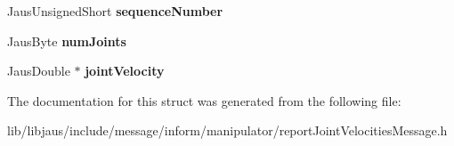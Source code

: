 \begin{DoxyCompactItemize}
\item 
\hypertarget{struct_report_joint_velocities_message_struct_a3d0eedb7246ea7f95f4e610151d31f1f}{\-Jaus\-Unsigned\-Short {\bfseries sequence\-Number}}\label{struct_report_joint_velocities_message_struct_a3d0eedb7246ea7f95f4e610151d31f1f}

\item 
\hypertarget{struct_report_joint_velocities_message_struct_a3cfe7d8bde53bf279ff0e1713fd44b6c}{\-Jaus\-Byte {\bfseries num\-Joints}}\label{struct_report_joint_velocities_message_struct_a3cfe7d8bde53bf279ff0e1713fd44b6c}

\item 
\hypertarget{struct_report_joint_velocities_message_struct_aaf1b5152424b3468eb76343627cd4510}{\-Jaus\-Double $\ast$ {\bfseries joint\-Velocity}}\label{struct_report_joint_velocities_message_struct_aaf1b5152424b3468eb76343627cd4510}

\end{DoxyCompactItemize}


\-The documentation for this struct was generated from the following file\-:\begin{DoxyCompactItemize}
\item 
lib/libjaus/include/message/inform/manipulator/report\-Joint\-Velocities\-Message.\-h\end{DoxyCompactItemize}
